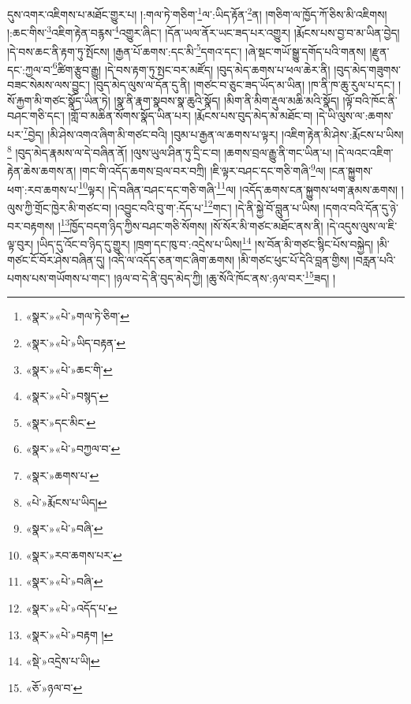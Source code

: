 \documentclass[12pt,a4paper]{book}
\begin{document}
དུས་འགར་འཇིགས་པ་མཐོང་གྱུར་པ། །:གལ་ཏེ་གཅིག་\footnote{«སྣར་»«པེ་»གལ་ཏེ་ཅིག་}ལ་:ཡིད་རྟོན་\footnote{«སྣར་»«པེ་»ཡིད་བརྟན་}ན། །གཅིག་ལ་ཁྱོད་ཀོ་ཅིས་མི་འཇིགས། །:ཆང་གིས་\footnote{«སྣར་»«པེ་»ཆང་གི་}འཇིག་རྟེན་བརྙས་\footnote{«སྣར་»«པེ་»བསྙད་}འགྱུར་ཞིང་། །དོན་ཡལ་ནོར་ཡང་ཟད་པར་འགྱུར། །རྨོངས་པས་བྱ་བ་མ་ཡིན་བྱེད། །དེ་བས་ཆང་ནི་རྟག་ཏུ་སྤོངས། །རྒྱན་པོ་ཆགས་:དང་མི་\footnote{«སྣར་»དང་མིང་}དགའ་དང་། །ཞེ་སྡང་གཡོ་སྒྱུ་དགོད་པའི་གནས། །རྫུན་དང་:ཀྱལ་བ་\footnote{«སྣར་»«པེ་»བཀྱལ་བ་}ཚིག་རྩུབ་རྒྱུ། །དེ་བས་རྟག་ཏུ་སྤང་བར་མཛོད། །བུད་མེད་ཆགས་པ་ཕལ་ཆེར་ནི། །བུད་མེད་གཟུགས་བཟང་སེམས་ལས་བྱུང་། །བུད་མེད་ལུས་ལ་དོན་དུ་ནི། །གཙང་བ་ཅུང་ཟད་ཡོད་མ་ཡིན། །ཁ་ནི་ཁ་ཆུ་རུལ་པ་དང་། །སོ་རྐྱག་མི་གཙང་སྣོད་ཡིན་ཏེ། །སྣ་ནི་རྣག་སྣབས་སྣ་ཆུའི་སྣོད། །མིག་ནི་མིག་རྡུལ་མཆི་མའི་སྣོད། །ལྟོ་བའི་ཁོང་ནི་བཤང་གཅི་དང་། །གློ་བ་མཆིན་སོགས་སྣོད་ཡིན་པར། །རྨོངས་པས་བུད་མེད་མ་མཐོང་བ། །དེ་ཡི་ལུས་ལ་:ཆགས་པར་\footnote{«སྣར་»ཆགས་པ་}བྱེད། །མི་ཤེས་འགའ་ཞིག་མི་གཙང་བའི། །བུམ་པ་རྒྱན་ལ་ཆགས་པ་ལྟར། །འཇིག་རྟེན་མི་ཤེས་:རྨོངས་པ་ཡིས།\footnote{«པེ་»རྨོངས་པ་ཡིད།} །བུད་མེད་རྣམས་ལ་དེ་བཞིན་ནོ། །ལུས་ཡུལ་ཤིན་ཏུ་དྲི་ང་བ། །ཆགས་བྲལ་རྒྱུ་ནི་གང་ཡིན་པ། །དེ་ལའང་འཇིག་རྟེན་ཆེས་ཆགས་ན། །གང་གི་འདོད་ཆགས་བྲལ་བར་བཀྲི། །ཇི་ལྟར་བཤང་དང་གཅི་གཞི་\footnote{«སྣར་»«པེ་»བཞི་}ལ། །ངན་སྐྱུགས་ཕག་:རབ་ཆགས་པ་\footnote{«སྣར་»རབ་ཆགས་པར་}ལྟར། །དེ་བཞིན་བཤང་དང་གཅི་གཞི་\footnote{«སྣར་»«པེ་»བཞི་}ལ། །འདོད་ཆགས་ངན་སྐྱུགས་ཕག་རྣམས་ཆགས། །ལུས་ཀྱི་གྲོང་ཁྱེར་མི་གཙང་བ། །འབྱུང་བའི་བུ་ག་:དོད་པ་\footnote{«སྣར་»«པེ་»འདོད་པ་}གང་། །དེ་ནི་སྐྱེ་བོ་བླུན་པ་ཡིས། །དགའ་བའི་དོན་དུ་ཉེ་བར་བརྟགས། །\footnote{«སྣར་»«པེ་»བརྟག །}ཁྱོད་བདག་ཉིད་ཀྱིས་བཤང་གཅི་སོགས། །སོ་སོར་མི་གཙང་མཐོང་ནས་ནི། །དེ་འདུས་ལུས་ལ་ཇི་ལྟ་བུར། །ཡིད་དུ་འོང་བ་ཉིད་དུ་གྱུར། །ཁྲག་དང་ཁུ་བ་:འདྲེས་པ་ཡིས།\footnote{«སྡེ་»འདྲེས་པ་ཡི།} །ས་བོན་མི་གཙང་སྙིང་པོས་བསྐྱེད། །མི་གཙང་ངོ་བོར་ཤེས་བཞིན་དུ། །འདི་ལ་འདོད་ཅན་གང་ཞིག་ཆགས། །མི་གཙང་ཕུང་པོ་དེའི་བླན་གྱིས། །བརླན་པའི་པགས་པས་གཡོགས་པ་གང་། །ཉལ་བ་དེ་ནི་བུད་མེད་ཀྱི། །ཆུ་སོའི་ཁོང་ནས་:ཉལ་བར་\footnote{«ཅོ་»ཉལ་བ་}ཟད། །
\end{document}
